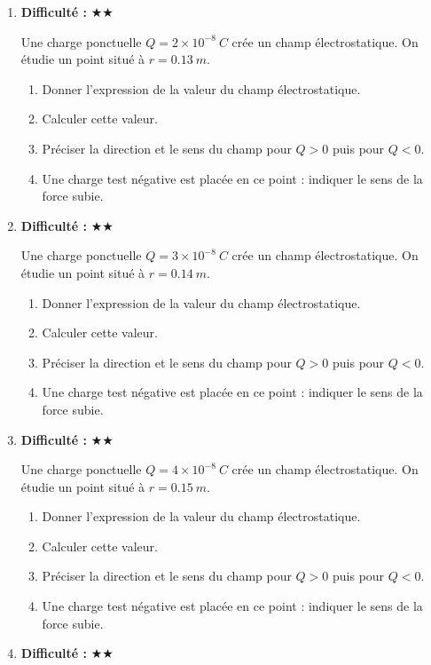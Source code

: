 \documentclass[11pt,a4paper]{article}
\newcommand{\etoiles}[1]{\textbf{Difficulté : }#1}
\begin{document}
\begin{enumerate}[label=\textbf{Exercice \arabic*.},leftmargin=*]
Une charge ponctuelle $Q=1\times10^{-8}\ \si{C}$ crée un champ électrostatique. On étudie un point situé à $r=0.12\ \si{m}$.
\begin{enumerate}[label=\alph*)]
\item Donner l'expression de la valeur du champ électrostatique.
\item Calculer cette valeur.
\item Préciser la direction et le sens du champ pour $Q>0$ puis pour $Q<0$.
\item Une charge test négative est placée en ce point : indiquer le sens de la force subie.
\end{enumerate}
\item \etoiles{★★}

Une charge ponctuelle $Q=2\times10^{-8}\ \si{C}$ crée un champ électrostatique. On étudie un point situé à $r=0.13\ \si{m}$.
\begin{enumerate}[label=\alph*)]
\item Donner l'expression de la valeur du champ électrostatique.
\item Calculer cette valeur.
\item Préciser la direction et le sens du champ pour $Q>0$ puis pour $Q<0$.
\item Une charge test négative est placée en ce point : indiquer le sens de la force subie.
\end{enumerate}
\item \etoiles{★★}

Une charge ponctuelle $Q=3\times10^{-8}\ \si{C}$ crée un champ électrostatique. On étudie un point situé à $r=0.14\ \si{m}$.
\begin{enumerate}[label=\alph*)]
\item Donner l'expression de la valeur du champ électrostatique.
\item Calculer cette valeur.
\item Préciser la direction et le sens du champ pour $Q>0$ puis pour $Q<0$.
\item Une charge test négative est placée en ce point : indiquer le sens de la force subie.
\end{enumerate}
\item \etoiles{★★}

Une charge ponctuelle $Q=4\times10^{-8}\ \si{C}$ crée un champ électrostatique. On étudie un point situé à $r=0.15\ \si{m}$.
\begin{enumerate}[label=\alph*)]
\item Donner l'expression de la valeur du champ électrostatique.
\item Calculer cette valeur.
\item Préciser la direction et le sens du champ pour $Q>0$ puis pour $Q<0$.
\item Une charge test négative est placée en ce point : indiquer le sens de la force subie.
\end{enumerate}
\item \etoiles{★★}


\end{enumerate}
\end{document}

